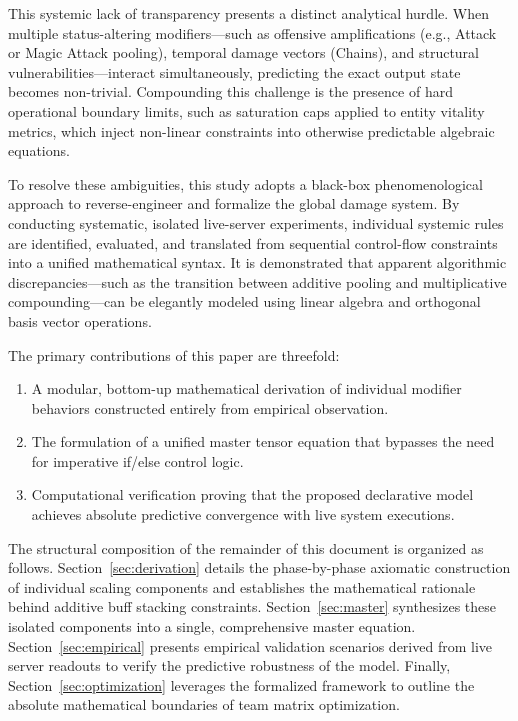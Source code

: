 \documentclass[twocolumn,10pt]{article}
\begin{document}
This systemic lack of transparency presents a distinct analytical hurdle. When multiple status-altering modifiers—such as offensive amplifications (e.g., Attack or Magic Attack pooling), temporal damage vectors (Chains), and structural vulnerabilities—interact simultaneously, predicting the exact output state becomes non-trivial. Compounding this challenge is the presence of hard operational boundary limits, such as saturation caps applied to entity vitality metrics, which inject non-linear constraints into otherwise predictable algebraic equations.

To resolve these ambiguities, this study adopts a black-box phenomenological approach to reverse-engineer and formalize the global damage system. By conducting systematic, isolated live-server experiments, individual systemic rules are identified, evaluated, and translated from sequential control-flow constraints into a unified mathematical syntax. It is demonstrated that apparent algorithmic discrepancies—such as the transition between additive pooling and multiplicative compounding—can be elegantly modeled using linear algebra and orthogonal basis vector operations.

The primary contributions of this paper are threefold:
\begin{enumerate}
  \item A modular, bottom-up mathematical derivation of individual modifier behaviors constructed entirely from empirical observation.
  \item The formulation of a unified master tensor equation that bypasses the need for imperative if/else control logic.
  \item Computational verification proving that the proposed declarative model achieves absolute predictive convergence with live system executions.
\end{enumerate}

The structural composition of the remainder of this document is organized as follows. Section~\ref{sec:derivation} details the phase-by-phase axiomatic construction of individual scaling components and establishes the mathematical rationale behind additive buff stacking constraints. Section~\ref{sec:master} synthesizes these isolated components into a single, comprehensive master equation. Section~\ref{sec:empirical} presents empirical validation scenarios derived from live server readouts to verify the predictive robustness of the model. Finally, Section~\ref{sec:optimization} leverages the formalized framework to outline the absolute mathematical boundaries of team matrix optimization.
\end{document}
